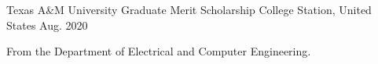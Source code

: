 
\begin{cventries}
  \cventry
    {Texas A\&M University} %
    {Graduate Merit Scholarship} %
    {College Station, United States} %
    {Aug. 2020} %
    {
      \begin{cvitems} %
        \item {From the Department of Electrical and Computer Engineering.}
      \end{cvitems}
    }
\end{cventries}
